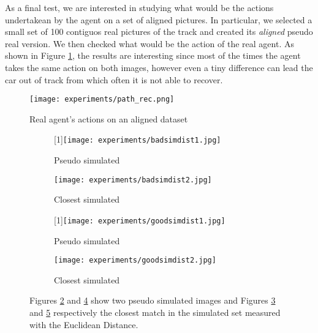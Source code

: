 As a final test, we are interested in studying what would be the actions undertakean by the agent on a set of aligned pictures. In particular, we selected a small set of 100 contiguos real pictures of the track and created its \textit{aligned} pseudo real version. We then checked what would be the action of the real agent. As shown in Figure \ref{fig:path_rec}, the results are interesting since most of the times the agent takes the same action on both images, however even a tiny difference can lead the car out of track from which often it is not able to recover.

\begin{figure}[h]
  \begin{center}
    \texttt{[image: experiments/path\_rec.png]}
  \end{center}
  \caption{Real agent's actions on an aligned dataset}
  \label{fig:path_rec}
\end{figure}

\begin{figure}[h]
  \centering
  \begin{subfigure}{.24\linewidth}
      \centering
      \scalebox{-1}[1]{\texttt{[image: experiments/badsimdist1.jpg]}}
      \caption{Pseudo simulated}\label{fig:badsimdist1}
  \end{subfigure}%
  \hfill
  \begin{subfigure}{.24\linewidth}
    \centering
    \texttt{[image: experiments/badsimdist2.jpg]}
    \caption{Closest simulated}\label{fig:badsimdist2}
  \end{subfigure}%
  \hfill
  \begin{subfigure}{.24\linewidth}
      \centering
      \scalebox{-1}[1]{\texttt{[image: experiments/goodsimdist1.jpg]}}
      \caption{Pseudo simulated}\label{fig:goodsimdist1}
  \end{subfigure}%
  \hfill
  \begin{subfigure}{.24\linewidth}
    \centering
    \texttt{[image: experiments/goodsimdist2.jpg]}
    \caption{Closest simulated}\label{fig:goodsimdist2}
\end{subfigure}
  \caption{Figures \ref{fig:badsimdist1} and \ref{fig:goodsimdist1} show two pseudo simulated images and Figures \ref{fig:badsimdist2} and \ref{fig:goodsimdist2} respectively the closest match in the simulated set measured with the Euclidean Distance.}
  \label{fig:simdistance}
\end{figure}

